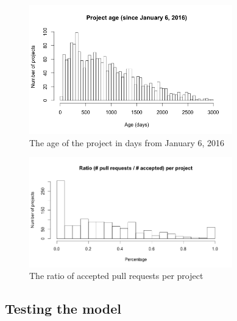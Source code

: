 	    \begin{figure}
	        \includegraphics[width=250pt]{figures/project-age}
	        \caption{The age of the project in days from January 6, 2016}
	        \label{fig:age-plot}
	    \end{figure}

	    \begin{figure}
	        \includegraphics[width=250pt]{figures/ratio-pull-request-per-project}
	        \caption{The ratio of accepted pull requests per project}
	        \label{fig:ratio-pull-requests-plot}
	    \end{figure}
    
    \subsection{Testing the model}

